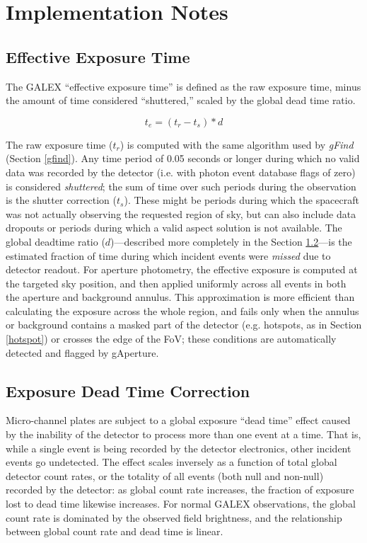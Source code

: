 \documentclass[preprint]{aastex}
\begin{document}
\section{Implementation Notes}
\label{implementation}

\subsection{Effective Exposure Time}
\label{effexptime}
The GALEX ``effective exposure time'' is defined as the raw exposure time, minus the amount of time considered ``shuttered,'' scaled by the global dead time ratio.

\[t_e=(t_r-t_s)*d\]

The raw exposure time ($t_r$) is computed with the same algorithm used by \emph{gFind} (Section \ref{gfind}). Any time period of 0.05 seconds or longer during which no valid data was recorded by the detector (i.e. with photon event database flags of zero) is considered \emph{shuttered}; the sum of time over such periods during the observation is the shutter correction ($t_s$). These might be periods during which the spacecraft was not actually observing the requested region of sky, but can also include data dropouts or periods during which a valid aspect solution is not available. The global deadtime ratio ($d$)---described more completely in the Section \ref{deadtimedesc}---is the estimated fraction of time during which incident events were \emph{missed} due to detector readout. For aperture photometry, the effective exposure is computed at the targeted sky position, and then applied uniformly across all events in both the aperture and background annulus. This approximation is more efficient than calculating the exposure across the whole region, and fails only when the annulus or background contains a masked part of the detector (e.g. hotspots, as in Section \ref{hotspot}) or crosses the edge of the FoV; these conditions are automatically detected and flagged by gAperture.

\subsection{Exposure Dead Time Correction}
\label{deadtimedesc}
Micro-channel plates are subject to a global exposure ``dead time'' effect caused by the inability of the detector to process more than one event at a time. That is, while a single event is being recorded by the detector electronics, other incident events go undetected. The effect scales inversely as a function of total global detector count rates, or the totality of all events (both null and non-null) recorded by the detector: as global count rate increases, the fraction of exposure lost to dead time likewise increases. For normal GALEX observations, the global count rate is dominated by the observed field brightness, and the relationship between global count rate and dead time is linear.
\end{document}
